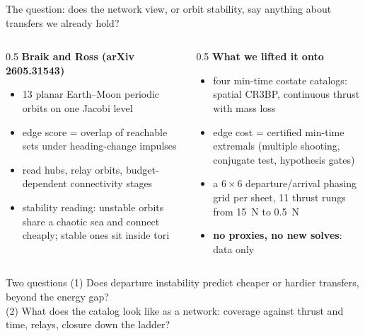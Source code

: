 \documentclass[aspectratio=169,10pt]{beamer}
\begin{document}
\begin{frame}{The question: does the network view, or orbit stability, say anything about transfers we already hold?}
  \small
  \begin{columns}[T]
    \begin{column}{0.5\textwidth}
      \textbf{Braik and Ross (arXiv 2605.31543)}
      \begin{itemize}
        \item 13 planar Earth--Moon periodic orbits on one Jacobi level
        \item edge score = overlap of reachable sets under heading-change impulses
        \item read hubs, relay orbits, budget-dependent connectivity stages
        \item stability reading: unstable orbits share a chaotic sea and connect cheaply; stable ones sit inside tori
      \end{itemize}
    \end{column}
    \begin{column}{0.5\textwidth}
      \textbf{What we lifted it onto}
      \begin{itemize}
        \item four min-time costate catalogs: spatial CR3BP, continuous thrust with mass loss
        \item edge cost = certified min-time extremals (multiple shooting, conjugate test, hypothesis gates)
        \item a $6\times6$ departure/arrival phasing grid per sheet, 11 thrust rungs from 15~N to 0.5~N
        \item \textbf{no proxies, no new solves}: data only
      \end{itemize}
    \end{column}
  \end{columns}
  \vspace{8pt}
  \begin{block}{Two questions}
    (1) Does departure instability predict cheaper or hardier transfers, beyond the energy gap?\\
    (2) What does the catalog look like as a network: coverage against thrust and time, relays, closure down the ladder?
  \end{block}
\end{frame}
\end{document}
